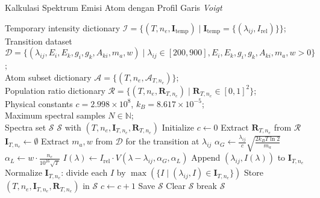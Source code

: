 \label{app:algo4}
\begin{algoritma}[H]
\small
\caption{Kalkulasi Spektrum Emisi Atom dengan Profil Garis \textit{Voigt}}
\begin{algorithmic}[1]
  \REQUIRE Temporary intensity dictionary $\mathcal{I} = \{ (T, n_e, \mathbf{I}_{\text{temp}}) \mid \mathbf{I}_{\text{temp}} = \{ (\lambda_{ij}, I_{\text{rel}}) \} \}$; \\ Transition dataset $\mathcal{D} = \{ (\lambda_{ij}, E_i, E_k, g_i, g_k, A_{ki}, m_a, w) \mid \lambda_{ij} \in [200, 900], E_i, E_k, g_i, g_k, A_{ki}, m_a, w > 0 \}$; \\ Atom subset dictionary $\mathcal{A} = \{ (T, n_e, \mathcal{A}_{T,n_e}) \}$; \\ Population ratio dictionary $\mathcal{R} = \{ (T, n_e, \mathbf{R}_{T,n_e}) \mid \mathbf{R}_{T,n_e} \in [0, 1]^2 \}$; \\ Physical constants $c = 2.998 \times 10^8$, $k_B = 8.617 \times 10^{-5}$; \\ Maximum spectral samples $N \in \mathbb{N}$; \\ Spectra set $\mathcal{S}$
  \ENSURE $\mathcal{S}$ with $(T, n_e, \mathbf{I}_{T,n_e}, \mathbf{R}_{T,n_e})$
  \STATE Initialize $c \gets 0$ 
    \STATE Extract $\mathbf{R}_{T,n_e}$ from $\mathcal{R}$ 
    \STATE $\mathbf{I}_{T,n_e} \gets \emptyset$ 
      \STATE Extract $m_a, w$ from $\mathcal{D}$ for the transition at $\lambda_{ij}$ 
      \STATE $\alpha_G \gets \frac{\lambda_{ij}}{c} \sqrt{\frac{2 k_B T \ln 2}{m_a}}$ 
      \STATE $\alpha_L \gets w \cdot \frac{n_e}{10^{16} \sqrt{T}}$ 
      \STATE $I(\lambda) \gets I_{\text{rel}} \cdot V(\lambda - \lambda_{ij}, \alpha_G, \alpha_L)$ 
      \STATE Append $(\lambda_{ij}, I(\lambda))$ to $\mathbf{I}_{T,n_e}$ 
    \ENDFOR
      \STATE Normalize $\mathbf{I}_{T,n_e}$: divide each $I$ by $\max(\{I \mid (\lambda_{ij}, I) \in \mathbf{I}_{T,n_e}\})$ 
    \ENDIF
    \STATE Store $(T, n_e, \mathbf{I}_{T,n_e}, \mathbf{R}_{T,n_e})$ in $\mathcal{S}$ 
    \STATE $c \gets c + 1$ 
      \STATE Save $\mathcal{S}$ 
      \STATE Clear $\mathcal{S}$ 
    \ENDIF
      \STATE break 
    \ENDIF
  \ENDFOR
  \RETURN $\mathcal{S}$ 
\end{algorithmic}
\end{algoritma}

